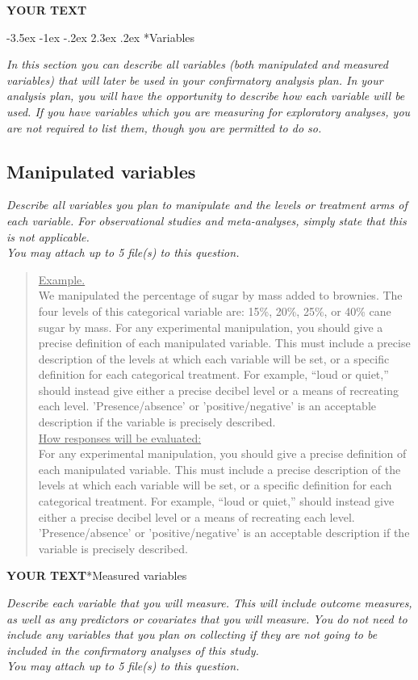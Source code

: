 \documentclass{article}
\makeatletter
\newcommand{\example}[2]{\vspace{-0.3cm}\begin{quote}\underline{Example.}\\#1\ifx#2\undefined \else \\[0.2cm]\underline{How responses will be evaluated:}\\#2\fi\\\end{quote}}
\newcommand{\yourtext}[1]{\noindent\textbf{\color{red}YOUR TEXT}}
\renewcommand{\section}{\@startsection {section}{1}{\z@}%
	{-3.5ex \@plus -1ex \@minus -.2ex}%
	{2.3ex \@plus .2ex}%
	{\normalfont\LARGE\bfseries}}
\makeatother
\begin{document}
	\yourtext
	
\newpage

\section*{Variables}

	\ifx\hidehints\undefined
	\textit{In this section you can describe all variables (both manipulated and measured variables) that will later be used in your confirmatory analysis plan. In your analysis plan, you will have the opportunity to describe how each variable will be used. If you have variables which you are measuring for exploratory analyses, you are not required to list them, though you are permitted to do so.}
	\fi
	
	\subsection*{Manipulated variables}
	
	\ifx\hidehints\undefined
	
	\textit{%
		Describe all variables you plan to manipulate and the levels or treatment arms of each variable. For observational studies and meta-analyses, simply state that this is not applicable.\\
		You may attach up to 5 file(s) to this question.
	}\\
	
	\example{
		We manipulated the percentage of sugar by mass added to brownies. The four levels of this categorical variable are: 15\%, 20\%, 25\%, or 40\% cane sugar by mass.}{
		For any experimental manipulation, you should give a precise definition of each manipulated variable. This must include a precise description of the levels at which each variable will be set, or a specific definition for each categorical treatment. For example, “loud or quiet,” should instead give either a precise decibel level or a means of recreating each level. 'Presence/absence' or 'positive/negative' is an acceptable description if the variable is precisely described.
		}
	
	\fi
	
	\yourtext
	
	\subsection*{Measured variables}
	
	\ifx\hidehints\undefined
	
	\textit{%
		Describe each variable that you will measure. This will include outcome measures, as well as any predictors or covariates that you will measure. You do not need to include any variables that you plan on collecting if they are not going to be included in the confirmatory analyses of this study.\\
		You may attach up to 5 file(s) to this question.
	}\\
	
\end{document}
